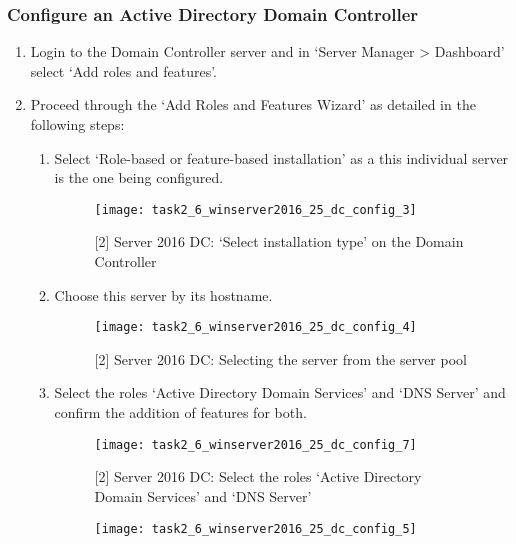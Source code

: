 
\subsubsection{Configure an Active Directory Domain Controller}
\begin{enumerate}[series=task2methodology3]
  \item Login to the Domain Controller server and in `Server Manager > Dashboard' select `Add roles and features'.
  \item Proceed through the `Add Roles and Features Wizard' as detailed in the following steps:
   \begin{enumerate}[label=(\alph*)]
     \item Select `Role-based or feature-based installation' as a this individual server is the one being configured.
       \begin{figure}[H]
         \centering
         \captionsetup{skip=2pt}
         \texttt{[image: task2\_6\_winserver2016\_25\_dc\_config\_3]}
         \caption{[2] Server 2016 DC: `Select installation type' on the Domain Controller}
         \label{fig:task2:vspherec_windc2_c3}
       \end{figure}
      \item Choose this server by its hostname.
        \begin{figure}[H]
          \centering
          \captionsetup{skip=2pt}
          \texttt{[image: task2\_6\_winserver2016\_25\_dc\_config\_4]}
          \caption{[2] Server 2016 DC: Selecting the server from the server pool}
          \label{fig:task2:vspherec_windc2_c4}
        \end{figure}
      \item Select the roles `Active Directory Domain Services' and `DNS Server' and confirm the addition of features for both.
        \begin{figure}[H]
          \centering
          \captionsetup{skip=2pt}
          \texttt{[image: task2\_6\_winserver2016\_25\_dc\_config\_7]}
          \caption{[2] Server 2016 DC: Select the roles `Active Directory Domain Services' and `DNS Server'}
          \label{fig:task2:vspherec_windc2_c7}
        \end{figure}
        \begin{figure}[H]
          \centering
          \captionsetup{skip=2pt}
          \texttt{[image: task2\_6\_winserver2016\_25\_dc\_config\_5]}

\end{figure}
\end{enumerate}
\end{enumerate}
